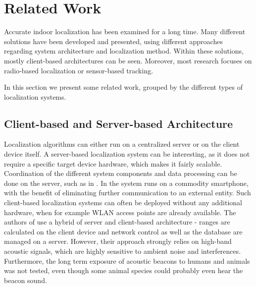 
\chapter{Related Work} %

\label{Chapter2} %
Accurate indoor localization has been examined for a long time. Many different solutions have been developed and presented, using different approaches regarding system architecture and localization method. Within these solutions, mostly client-based architectures can be seen. Moreover, most research focuses on radio-based localization or sensor-based tracking.

In this section we present some related work, grouped by the different types of localization systems.


\section{Client-based and Server-based Architecture}
Localization algorithms can either run on a centralized server or on the client device itself. A server-based localization system can be interesting, as it does not require a specific target device hardware, which makes it fairly scalable. Coordination of the different system components and data processing can be done on the server, such as in \cite{Delmastro}.
In \cite{Carrera} the system runs on a commodity smartphone, with the benefit of eliminating further communication to an external entity. Such client-based localization systems can often be deployed without any additional hardware, when for example WLAN access points are already available. The authors of \cite{Guoguo} use a hybrid of server and client-based architecture - ranges are calculated on the client device and network control as well as the database are managed on a server. However, their approach strongly relies on high-band acoustic signals, which are highly sensitive to ambient noise and interferences. Furthermore, the long term exposure of acoustic beacons to humans and animals was not tested, even though some animal species could probably even hear the beacon sound.

